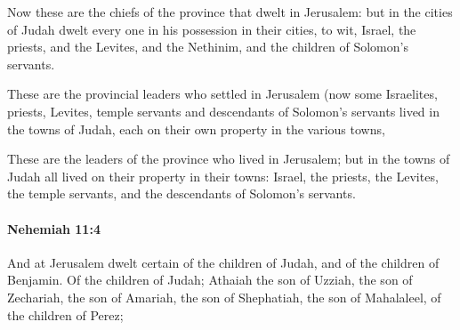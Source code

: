 			\begin{versebox}
					\item[BHS] 
					\item[LXX] 
					\item[ASV] Now these are the chiefs of the province that dwelt in Jerusalem: but in the cities of Judah dwelt every one in his possession in their cities, to wit, Israel, the priests, and the Levites, and the Nethinim, and the children of Solomon's servants.
					\item[NIV] These are the provincial leaders who settled in Jerusalem (now some Israelites, priests, Levites, temple servants and descendants of Solomon’s servants lived in the towns of Judah, each on their own property in the various towns,
					\item[NRSV] These are the leaders of the province who lived in Jerusalem; but in the towns of Judah all lived on their property in their towns: Israel, the priests, the Levites, the temple servants, and the descendants of Solomon’s servants.
			\end{versebox}

		\paragraph{Nehemiah 11:4} %
			\label{NEHEMIAH-11-4}

			And at Jerusalem dwelt certain of the children of Judah, and of the children of Benjamin. Of the children of Judah; Athaiah the son of Uzziah, the son of Zechariah, the son of Amariah, the son of Shephatiah, the son of Mahalaleel, of the children of Perez;

